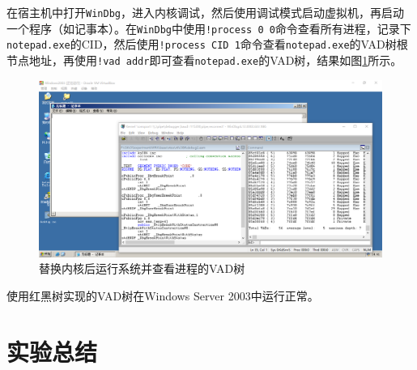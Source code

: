 \documentclass[a4paper, 11pt]{article}
\begin{document}
        在宿主机中打开\texttt{WinDbg}，进入内核调试，然后使用调试模式启动虚拟机，再启动一个程序（如记事本）。在\texttt{WinDbg}中使用\texttt{!process 0 0}命令查看所有进程，记录下\texttt{notepad.exe}的CID，然后使用\texttt{!process CID 1}命令查看\texttt{notepad.exe}的VAD树根节点地址，再使用\texttt{!vad addr}即可查看\texttt{notepad.exe}的VAD树\cite{WinInternal}，结果如图\ref{fig:vad4notepad}所示。
        \begin{figure}[htb]
            \centering
            \includegraphics[width=\textwidth]{images/vad4notepad.png}
            \caption{替换内核后运行系统并查看进程的VAD树}
            \label{fig:vad4notepad}
        \end{figure}
        
        使用红黑树实现的VAD树在Windows Server 2003中运行正常。
    
    \section{实验总结}
    
    
    
    
\end{document}
